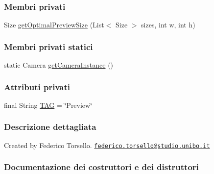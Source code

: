 \subsubsection*{Membri privati}
\begin{DoxyCompactItemize}
\item 
Size \hyperlink{classit_1_1unibo_1_1torsello_1_1bluetoothpositioning_1_1examplesCamera_1_1Preview_a46718c866d8f8bc77c5efb98f38e8ad8_a46718c866d8f8bc77c5efb98f38e8ad8}{get\+Optimal\+Preview\+Size} (List$<$ Size $>$ sizes, int w, int h)
\end{DoxyCompactItemize}
\subsubsection*{Membri privati statici}
\begin{DoxyCompactItemize}
\item 
static Camera \hyperlink{classit_1_1unibo_1_1torsello_1_1bluetoothpositioning_1_1examplesCamera_1_1Preview_a89ed563293f04de8313a866702452738_a89ed563293f04de8313a866702452738}{get\+Camera\+Instance} ()
\end{DoxyCompactItemize}
\subsubsection*{Attributi privati}
\begin{DoxyCompactItemize}
\item 
final String \hyperlink{classit_1_1unibo_1_1torsello_1_1bluetoothpositioning_1_1examplesCamera_1_1Preview_a0e05d509a5425eba210e8d1a816c1d42_a0e05d509a5425eba210e8d1a816c1d42}{T\+AG} = \char`\"{}Preview\char`\"{}
\end{DoxyCompactItemize}


\subsubsection{Descrizione dettagliata}
Created by Federico Torsello. \href{mailto:federico.torsello@studio.unibo.it}{\tt federico.\+torsello@studio.\+unibo.\+it} 

\subsubsection{Documentazione dei costruttori e dei distruttori}
\hypertarget{classit_1_1unibo_1_1torsello_1_1bluetoothpositioning_1_1examplesCamera_1_1Preview_ae54d5d8e5125fd0a38b28d9416cc0191_ae54d5d8e5125fd0a38b28d9416cc0191}{}\label{classit_1_1unibo_1_1torsello_1_1bluetoothpositioning_1_1examplesCamera_1_1Preview_ae54d5d8e5125fd0a38b28d9416cc0191_ae54d5d8e5125fd0a38b28d9416cc0191} 

